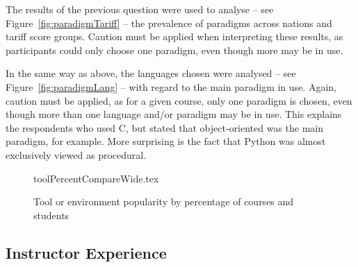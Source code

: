 \documentclass[english]{programming}
\begin{document}
The results of the previous question were used to analyse -- see
Figure~\ref{fig:paradigmTariff} -- the prevalence of paradigms across
nations and tariff score groups. Caution must be applied when
interpreting these results, as participants could only choose one
paradigm, even though more may be in use.


In the same way as above, the languages chosen were analysed -- see
Figure~\ref{fig:paradigmLang} -- with regard to the main paradigm in
use. Again, caution must be applied, as for a given course, only one
paradigm is chosen, even though more than one language and/or paradigm
may be in use. This explains the respondents who used C, but stated
that object-oriented was the main paradigm, for example. More
surprising is the fact that Python was almost exclusively viewed as
procedural.


%

\begin{figure}
\begin{center}
{toolPercentCompareWide.tex}
\caption{Tool or environment popularity by percentage of courses and students\label{fig:tools}}
\end{center}
\end{figure}

\subsection{Instructor Experience}
\end{document}
